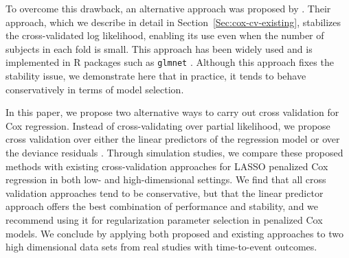 


\par To overcome this drawback, an alternative approach was proposed by \citet{Verweij1993}.  Their approach, which we describe in detail in Section~\ref{Sec:cox-cv-existing}, stabilizes the cross-validated log likelihood, enabling its use even when the number of subjects in each fold is small.  This approach has been widely used and is implemented in R packages such as {\tt glmnet} \citep{glmnet}.  Although this approach fixes the stability issue, we demonstrate here that in practice, it tends to behave conservatively in terms of model selection.

\par In this paper, we propose two alternative ways to carry out cross validation for Cox regression. Instead of cross-validating over partial likelihood, we propose cross validation over either the linear predictors of the regression model or over the deviance residuals \citep{Therneau1990}. Through simulation studies, we compare these proposed methods with existing cross-validation approaches for LASSO penalized Cox regression in both low- and high-dimensional settings.  We find that all cross validation approaches tend to be conservative, but that the linear predictor approach offers the best combination of performance and stability, and we recommend using it for regularization parameter selection in penalized Cox models.  We conclude by applying both proposed and existing approaches to two high dimensional data sets from real studies with time-to-event outcomes.

